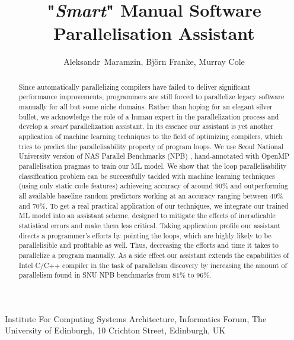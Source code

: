 \documentclass{acaces}
\begin{document}
\title{"\textit{Smart}" Manual Software Parallelisation Assistant}

\author{
Aleksandr~Maramzin,
Bj\"{o}rn Franke,
Murray Cole
}

\address{1}{
Institute For Computing Systems Architecture, 
Informatics Forum, 
The University of Edinburgh, 
10 Crichton Street, 
Edinburgh, 
UK
}


\pagestyle{empty}


\begin{abstract}
\quad Since automatically parallelizing compilers have failed to deliver significant performance improvements, programmers are still forced to parallelize legacy software manually for all but some niche domains. Rather than hoping for an elegant silver bullet, we acknowledge the role of a human expert in the parallelization process and develop a \textit{smart} parallelization assistant.\newline\null
\quad In its essence our assistant is yet another application of machine learning techniques to the field of optimizing compilers, which tries to predict the parallelisability property of program loops. We use Seoul National University version of NAS Parallel Benchmarks (NPB) \cite{nasa-parallel-benchmarks}, \cite{snu-npb-benchmarks} hand-annotated with OpenMP parallelisation pragmas to train our ML model. We show that the loop parallelisability classification problem can be successfully tackled with machine learning techniques (using only static code features) achieveing accuracy of around 90\% and outperforming all available baseline random predictors working at an accuracy ranging between 40\% and 70\%.\newline\null
\quad To get a real practical application of our techniques, we integrate our trained ML model into an assistant scheme, designed to mitigate the effects of ineradicable statistical errors and make them less critical. Taking application profile our assistant directs a programmer's efforts by pointing the loops, which are highly likely to be parallelisible and profitable as well. Thus, decreasing the efforts and time it takes to parallelize a program manually. As a side effect our assistant extends the capabilities of Intel C/C++ compiler in the task of parallelism discovery by increasing the amount of parallelism found in SNU NPB benchmarks from 81\% to 96\%.
\end{abstract}
\end{document}
